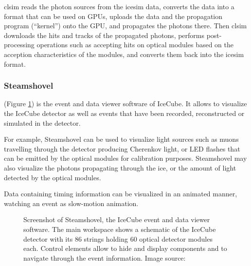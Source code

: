 clsim reads the photon sources from the icesim data, converts the data into a format that can be used on GPUs, uploads the data and the propagation program (``kernel'') onto the GPU, and propagates the photons there. Then clsim downloads the hits and tracks of the propagated photons, performs post-processing operations such as accepting hits on optical modules based on the acception characteristics of the modules, and converts them back into the icesim format.





\subsubsection{Steamshovel}

 (Figure \ref{fig:steamshovel}) is the event and data viewer software of IceCube. It allows to visualize the IceCube detector as well as events that have been recorded, reconstructed or simulated in the detector.

For example, Steamshovel can be used to visualize light sources such as muons travelling through the detector producing Cherenkov light, or LED flashes that can be emitted by the optical modules for calibration purposes. Steamshovel may also visualize the photons propagating through the ice, or the amount of light detected by the optical modules.

Data containing timing information can be visualized in an animated manner, watching an event as slow-motion animation.

\begin{figure}
  \label{fig:steamshovel}
  \caption{Screenshot of Steamshovel, the IceCube event and data viewer software. The main workspace shows a schematic of the IceCube detector with its 86 strings holding 60 optical detector modules each. Control elements allow to hide and display components and to navigate through the event information. Image source: \cite{steamshoveldocumentation}}
\end{figure}

